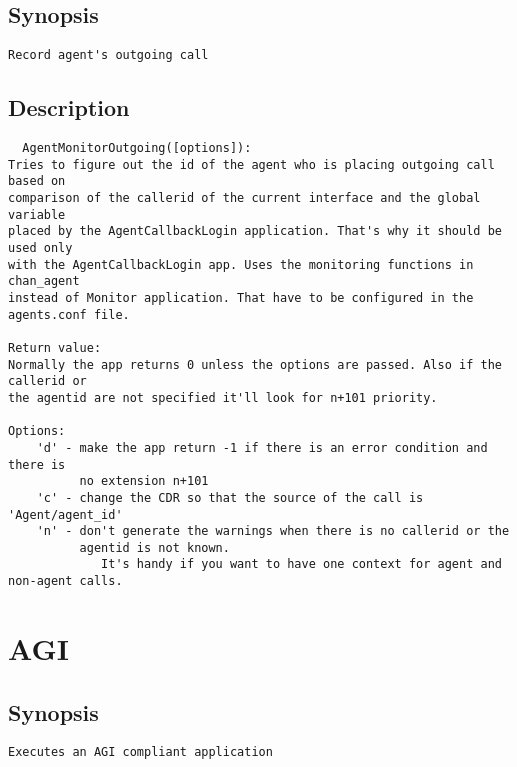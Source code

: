 \subsection{Synopsis}
\begin{verbatim}
Record agent's outgoing call
\end{verbatim}
\subsection{Description}
\begin{verbatim}
  AgentMonitorOutgoing([options]):
Tries to figure out the id of the agent who is placing outgoing call based on
comparison of the callerid of the current interface and the global variable 
placed by the AgentCallbackLogin application. That's why it should be used only
with the AgentCallbackLogin app. Uses the monitoring functions in chan_agent 
instead of Monitor application. That have to be configured in the agents.conf file.

Return value:
Normally the app returns 0 unless the options are passed. Also if the callerid or
the agentid are not specified it'll look for n+101 priority.

Options:
	'd' - make the app return -1 if there is an error condition and there is
	      no extension n+101
	'c' - change the CDR so that the source of the call is 'Agent/agent_id'
	'n' - don't generate the warnings when there is no callerid or the
	      agentid is not known.
             It's handy if you want to have one context for agent and non-agent calls.

\end{verbatim}


\section{AGI}
\subsection{Synopsis}
\begin{verbatim}
Executes an AGI compliant application
\end{verbatim}
